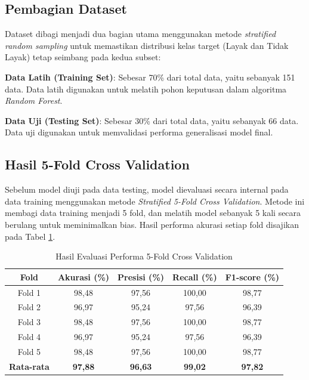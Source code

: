 \subsection{Pembagian Dataset}
Dataset dibagi menjadi dua bagian utama menggunakan metode \textit{stratified random sampling} untuk memastikan distribusi kelas target (Layak dan Tidak Layak) tetap seimbang pada kedua subset:
\begin{packed_item}
    \item \textbf{Data Latih (Training Set)}: Sebesar 70\% dari total data, yaitu sebanyak 151 data. Data latih digunakan untuk melatih pohon keputusan dalam algoritma \textit{Random Forest}.
    \item \textbf{Data Uji (Testing Set)}: Sebesar 30\% dari total data, yaitu sebanyak 66 data. Data uji digunakan untuk memvalidasi performa generalisasi model final.
\end{packed_item}

\subsection{Hasil 5-Fold Cross Validation}
Sebelum model diuji pada data testing, model dievaluasi secara internal pada data training menggunakan metode \textit{Stratified 5-Fold Cross Validation}. Metode ini membagi data training menjadi 5 fold, dan melatih model sebanyak 5 kali secara berulang untuk meminimalkan bias. Hasil performa akurasi setiap fold disajikan pada Tabel \ref{tab:cross-validation}.

\begin{table}[htbp]
    \centering
    \caption{Hasil Evaluasi Performa 5-Fold Cross Validation}
    \label{tab:cross-validation}
    \fontsize{10pt}{12pt}\selectfont
    \begin{tabular}{|c|c|c|c|c|}
        \hline
        \textbf{Fold} & \textbf{Akurasi (\%)} & \textbf{Presisi (\%)} & \textbf{Recall (\%)} & \textbf{F1-score (\%)} \\
        \hline
        Fold 1 & 98,48 & 97,56 & 100,00 & 98,77 \\
        \hline
        Fold 2 & 96,97 & 95,24 & 97,56 & 96,39 \\
        \hline
        Fold 3 & 98,48 & 97,56 & 100,00 & 98,77 \\
        \hline
        Fold 4 & 96,97 & 95,24 & 97,56 & 96,39 \\
        \hline
        Fold 5 & 98,48 & 97,56 & 100,00 & 98,77 \\
        \hline
        \textbf{Rata-rata} & \textbf{97,88} & \textbf{96,63} & \textbf{99,02} & \textbf{97,82} \\
        \hline
    \end{tabular}
\end{table}

